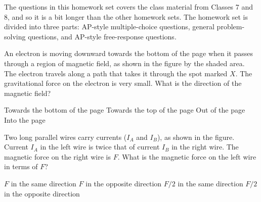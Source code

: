 \documentclass{../../oss-apphys-exam}
\begin{document}

The questions in this homework set covers the class material from Classes 7
and 8, and so it is a bit longer than the other homework sets. The homework set
is divided into three parts: AP-style multiple-choice questions, general
problem-solving questions, and AP-style free-response questions.

\begin{questions}
  \classkickMCinstructions
  
  \question An electron is moving downward towards the bottom of the page when
  it passes through a region of magnetic field, as shown in the figure by the
  shaded area. The electron travels along a path that takes it through the spot
  marked $X$. The gravitational force on the electron is very small. What is
  the direction of the magnetic field?
  \begin{center}
  \end{center}
  \begin{choices}
    \choice Towards the bottom of the page
    \choice Towards the top of the page
    \choice Out of the page
    \choice Into the page
  \end{choices}
  
  \question Two long parallel wires carry currents ($I_A$ and $I_B$), as shown
  in the figure. Current $I_A$ in the left wire is twice that of current $I_B$
  in the right wire. The magnetic force on the right wire is $F$. What is the
  magnetic force on the left wire in terms of $F$?
  \begin{center}
  \end{center}
  \begin{choices}
    \choice $F$ in the same direction
    \choice $F$ in the opposite direction
    \choice $F/2$ in the same direction
    \choice $F/2$ in the opposite direction
  \end{choices}
  

\end{questions}
\end{document}
